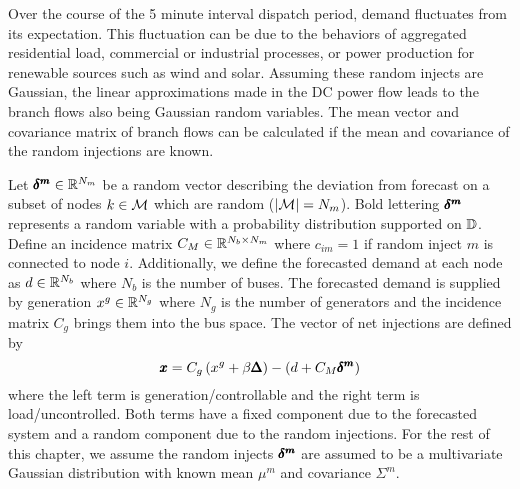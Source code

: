 Over the course of the 5 minute interval dispatch period, demand  fluctuates from its expectation.  This  fluctuation can be due to the behaviors of aggregated residential load, commercial or industrial processes, or power production for renewable sources such as wind and solar.  Assuming these random injects are Gaussian, the linear approximations made in the DC power flow leads to the branch flows also being Gaussian random variables.  The mean vector and covariance matrix of branch flows can be calculated if the mean and covariance of the random injections are known.

Let $\pmb{\delta^m} \in \mathbb{R}^{N_m}$ be a random vector describing the deviation from forecast on a subset of nodes $k \in \mathcal{M}$ which are random ($| \mathcal{M} | = N_m$).  Bold lettering $\pmb{\delta^m}$ represents a random variable with a probability distribution supported on $\mathbb{D}$.  Define an incidence matrix $C_M \in \mathbb{R}^{N_b \times N_m}$ where $c_{im}=1$ if random inject $m$ is connected to node $i$.  Additionally, we define the forecasted demand at each node as $d \in \mathbb{R}^{N_b}$ where $N_b$ is the number of buses.  The forecasted demand is supplied by generation $x^g \in \mathbb{R}^{N_g}$ where $N_g$ is the number of generators and the incidence matrix $C_g$ brings them into the bus space.    The vector of net injections are defined by 
\begin{equation}\label{rand_inj}
 \pmb{x} = C_g\left(x^g+\beta \pmb{\Delta}\right) - (d + C_M \pmb{\delta^m}) 
\end{equation}
 where the left term is generation/controllable and the right term is load/uncontrolled.  Both terms have a fixed component due to the forecasted system and a random component due to the random injections.  For the rest of this chapter, we assume the random injects $\pmb{\delta^m}$ are assumed to be a multivariate Gaussian distribution with known mean $\mu^m$ and covariance $\Sigma^m$.  

